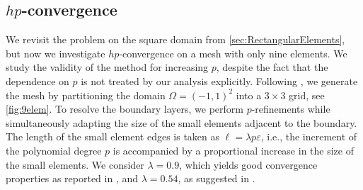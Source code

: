 \documentclass[a4paper,twoside,10pt]{article}
\newcommand{\eps}{\varepsilon}
\numberwithin{equation}{section}
\begin{document}
\subsection{\texorpdfstring{$hp$}{hp}-convergence}\label{sec:nineelements}
We revisit the problem on the square domain from \cref{sec:RectangularElements}, but now we investigate $hp$-convergence on a mesh with only nine elements.
We study the validity of the method for increasing $p$, despite the fact that the dependence on $p$ is not treated by our analysis explicitly.
Following \cite[Example 9.1]{G06hp}, we generate the mesh by partitioning the domain $\Omega=(-1,1)^2$ into a $3\times 3$ grid, see \cref{fig:9elem}.
To resolve the boundary layers, we perform $p$-refinements while simultaneously adapting the size of the small elements adjacent to the boundary.
The length of the small element edges is taken as $\ell = \lambda p \eps$, i.e., 
the increment of the polynomial degree $p$ is accompanied by a proportional increase in the size of the small elements.
We consider $\lambda=0.9$, which yields good convergence properties as reported in 
\cite{G06hp}, and $\lambda=0.54$, as suggested in
\cite{SS96bh}.
\end{document}
